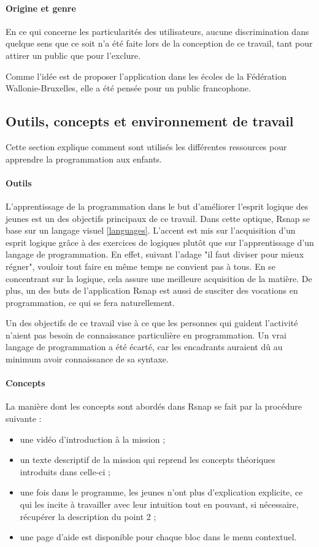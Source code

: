 \paragraph{Origine et genre}
En ce qui concerne les particularités des utilisateurs, aucune discrimination dans quelque sens que ce soit n'a été faite lors de la conception de ce travail, tant pour attirer un public que pour l'exclure. 

Comme l'idée est de proposer l'application dans les écoles de la Fédération Wallonie-Bruxelles, elle a été pensée pour un public francophone. 

\subsection{Outils, concepts et environnement de travail}
Cette section explique comment sont utilisés les différentes ressources pour apprendre la programmation aux enfants.

\paragraph{Outils}
\label{outil}
L'apprentissage de la programmation dans le but d'améliorer l'esprit logique des jeunes est un des objectifs principaux de ce travail. Dans cette optique, Rsnap se base sur un langage visuel \ref{languages}. L'accent est mis sur l'acquisition d'un esprit logique grâce à des exercices de logiques plutôt que sur l'apprentissage d'un langage de programmation.  En effet, suivant l'adage "il faut diviser pour mieux régner", vouloir tout faire en même temps ne convient pas à tous. En se concentrant sur la logique, cela assure une meilleure acquisition de la matière. De plus, un des buts de l'application Rsnap est aussi de susciter des vocations en programmation, ce qui se fera naturellement.

Un des objectifs de ce travail vise à ce que les personnes qui guident l'activité n'aient pas besoin de connaissance particulière en programmation. Un vrai langage de programmation a été écarté, car les encadrants auraient dû au minimum avoir connaissance de sa syntaxe.

\paragraph{Concepts}
La manière dont les concepts sont abordés dans Rsnap se fait par la procédure suivante :
\begin{itemize}
	\item une vidéo d'introduction à la mission ;
	\item un texte descriptif de la mission qui reprend les concepts théoriques introduits dans celle-ci ;
	\item une fois dans le programme, les jeunes n'ont plus d'explication explicite, ce qui les incite à travailler avec leur intuition tout en pouvant, si nécessaire, récupérer la description du point 2 ;
	\item une page d'aide est disponible pour chaque bloc dans le menu contextuel. %
\end{itemize}

